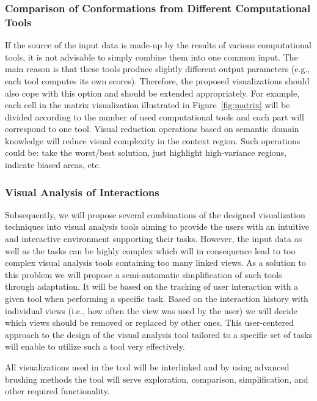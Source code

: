\documentclass[11pt,a4paper,titlepage,oneside,onecolumn]{article}
\begin{document}
\subsubsection{Comparison of Conformations from Different Computational Tools}
If the source of the input data is made-up by the results of various computational tools, it is not advisable to simply combine them into one common input.
The main reason is that these tools produce slightly different output parameters (e.g., each tool computes its own scores). 
Therefore, the proposed visualizations should also cope with this option and should be extended appropriately. 
For example, each cell in the matrix visualization illustrated in Figure~\ref{fig:matrix} will be divided according to the number of used computational tools and each part will correspond to one tool.
Visual reduction operations based on semantic domain knowledge will reduce visual complexity in the context region.
Such operations could be: take the worst/best solution, just highlight high-variance regions, indicate biased areas, etc.



\subsubsection{Visual Analysis of Interactions}
Subsequently, we will propose several combinations of the designed visualization techniques into visual analysis tools aiming to provide the users with an intuitive and interactive environment supporting their tasks.
However, the input data as well as the tasks can be highly complex which will in consequence lead to too complex visual analysis tools containing too many linked views.
As a solution to this problem we will propose a semi-automatic simplification of such tools through adaptation.
It will be based on the tracking of user interaction with a given tool when performing a specific task.
Based on the interaction history with individual views (i.e., how often the view was used by the user) we will decide which views should be removed or replaced by other ones. 
This user-centered approach to the design of the visual analysis tool tailored to a specific set of tasks will enable to utilize such a tool very effectively.

All visualizations used in the tool will be interlinked and by using advanced brushing methods the tool will serve exploration, comparison, simplification, and other required functionality.
\end{document}
